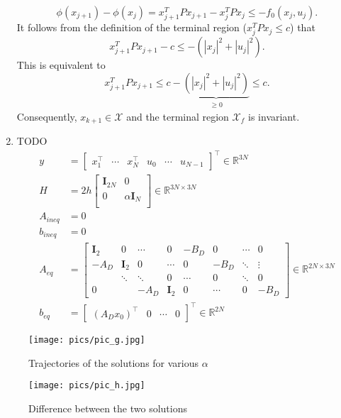 \documentclass[12pt,pdftex,a4paper]{scrartcl}
\newcommand{\set}[1]{\mathbb{#1}}
\newcommand{\mat}[1]{\textbf{#1}}
\begin{document}
\begin{enumerate}
\begin{compactenum}[1.]
   \begin{equation*}
       \phi(x_{j+1})-\phi(x_j) = x_{j+1}^T P x_{j+1} - x_j^T P x_j \leq -f_0(x_j,u_j).
   \end{equation*}
   It follows from the definition of the terminal region ($x_j^T P x_j \leq c$) that 
   \begin{equation*}
       x_{j+1}^T P x_{j+1} - c \leq -(|x_j|^2 + |u_j|^2).
   \end{equation*}
   This is equivalent to 
   \begin{equation*}
       x_{j+1}^T P x_{j+1} \leq c - \underbrace{(|x_j|^2 + |u_j|^2)}_{\substack{\geq 0}} \leq c.
   \end{equation*}
   Consequently, $x_{k+1} \in \mathcal{X}$ and the terminal region $\mathcal{X}_f$ is invariant.
   \end{compactenum}

   \item TODO
   \begin{align*}
		y &=
		\begin{bmatrix}
			x_1^\top & \cdots & x_N^\top & u_0 &  \cdots & u_{N-1} 
		\end{bmatrix}^\top
		\in \set{R}^{3N} \\
		H &= 2h
		\begin{bmatrix}
			\mat{I}_{2N} & 0 \\
			0 & \alpha\mat{I}_{N}\\
		\end{bmatrix}
		\in \set{R}^{3N \times 3N} \\
		A_{ineq} &= 0 \\
		b_{ineq} &= 0 \\		
		A_{eq} &= 
		\begin{bmatrix}
			\mat{I}_2 & 0 & \cdots & 0 & -B_D & 0 & \cdots & 0 \\
			-A_D & \mat{I}_2 & 0 & \cdots & 0 & -B_D & \ddots &\vdots\\
			& \ddots & \ddots & 0 & \cdots & 0 & \ddots & 0\\
			0 & & -A_D & \mat{I}_2 & 0 & \cdots & 0 & -B_D
		\end{bmatrix}
		\in \set{R}^{2N \times 3N} \\	
		b_{eq} &= 
		\begin{bmatrix}
			(A_D x_0)^\top & 0 & \cdots & 0
		\end{bmatrix}^\top
		\in \set{R}^{2N}
	\end{align*}
    
\end{enumerate}


	\begin{figure}[H]
		\centering
		\texttt{[image: pics/pic\_g.jpg]}
		\caption{Trajectories of the solutions for various $\alpha$}		
		\label{fig:pic_g}
	\end{figure}

	\begin{figure}[H]
		\centering
		\texttt{[image: pics/pic\_h.jpg]}
		\caption{Difference between the two solutions}		
		\label{fig:pic_h}
	\end{figure}
\end{document}
